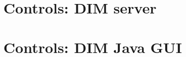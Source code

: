 
\chapter{\dabc~ Controls: DIM server}
 \cleardoublepage
\chapter{\dabc~ Controls: DIM Java GUI}
 \cleardoublepage

